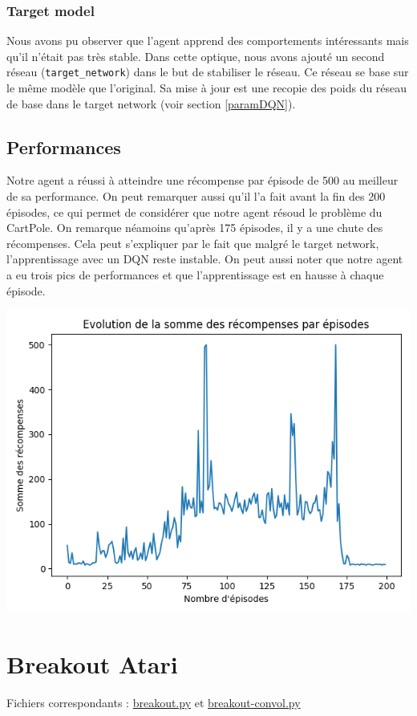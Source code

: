 \documentclass[10pt,a4paper]{article}
\begin{document}
\subsubsection{Target model} \label{targetmodelDQN}

Nous avons pu observer que l'agent apprend des comportements intéressants mais qu'il n'était pas très stable. Dans cette optique, nous avons ajouté un second réseau (\lstinline{target_network}) dans le but de stabiliser le réseau. Ce réseau se base sur le même modèle que l'original. Sa mise à jour est une recopie des poids du réseau de base dans le target network (voir section \ref{paramDQN}).

\subsection{Performances}

Notre agent a réussi à atteindre une récompense par épisode de 500 au meilleur de sa performance. On peut remarquer aussi qu'il l'a fait avant la fin des 200 épisodes, ce qui permet de considérer que notre agent résoud le problème du CartPole. On remarque néamoins qu'après 175 épisodes, il y a une chute des récompenses. Cela peut s'expliquer par le fait que malgré le target network, l'apprentissage avec un DQN reste instable. On peut aussi noter que notre agent a eu trois pics de performances et que l'apprentissage est en hausse à chaque épisode.

\includegraphics[scale=0.5]{../performances/evolution_recompenses_dqn_cartpole.png}

\section{Breakout Atari}
Fichiers correspondants : \href{https://github.com/NellyBarret/IA5-TP-APR/blob/master/sources/breakout.py}{breakout.py} et \href{https://github.com/NellyBarret/IA5-TP-APR/blob/master/sources/breakout-convol.py}{breakout-convol.py}
\end{document}
